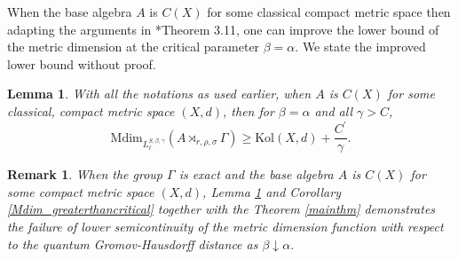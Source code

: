 \documentclass[a4paper,11pt,reqno]{amsart}
\theoremstyle{plain}
\newtheorem{lem}[thm]{Lemma}
\newtheorem{rem}[thm]{Remark}
\theoremstyle{mainthmstyle}
\theoremstyle{named}
\numberwithin{equation}{section}
\begin{document}
When the base algebra $A$ is $C(X)$ for some classical compact metric space then adapting the arguments in \cite{Soumalya-Arnab2}*{Theorem 3.11}, one can improve the lower bound of the metric dimension at the critical parameter $\beta=\alpha$. We state the improved lower bound without proof.


\begin{lem}\label{improvedlowerbound}
    With all the notations as used earlier, when $A$ is $C(X)$ for some classical, compact metric space $(X,d)$, then for $\beta=\alpha$ and all $\gamma>C$,
    \begin{displaymath}
    \mathrm{Mdim}_{L_{\ell}^{S, \beta, \gamma}} \left (A \rtimes_{r, \rho, \sigma} \Gamma \right )\geq \mathrm{Kol}(X,d)+\frac{C^{\prime}}{\gamma}.\end{displaymath}
\end{lem}



\begin{rem}\label{lowersemicontinuity}
    When the group $\Gamma$ is exact and the base algebra $A$ is $C(X)$ for some compact metric space $(X,d)$, Lemma \ref{improvedlowerbound} and Corollary \ref{Mdim_greaterthancritical} together with the Theorem \ref{mainthm} demonstrates the failure of lower semicontinuity of the metric dimension function with respect to the quantum Gromov-Hausdorff distance as $\beta\downarrow\alpha$. 
\end{rem}
\end{document}
